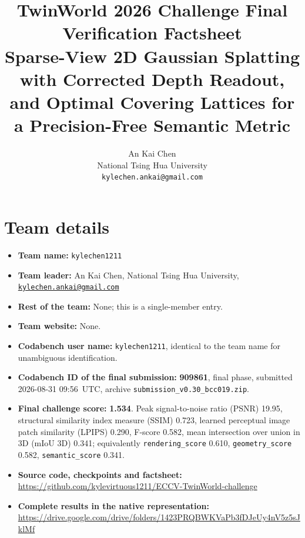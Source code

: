 \documentclass[10pt,twocolumn,letterpaper]{article}
\newcommand{\code}[1]{\texttt{\small #1}}
\begin{document}
\title{TwinWorld 2026 Challenge Final Verification Factsheet\\
       Sparse-View 2D Gaussian Splatting with Corrected Depth Readout,\\
       and Optimal Covering Lattices for a Precision-Free Semantic Metric}

\author{An Kai Chen\\
National Tsing Hua University\\
{\tt\small kylechen.ankai@gmail.com}
}
\maketitle

\section{Team details}

\begin{itemize}\itemsep2pt
\item \textbf{Team name:} \code{kylechen1211}
\item \textbf{Team leader:} An Kai Chen, National Tsing Hua University,
      \href{mailto:kylechen.ankai@gmail.com}{\tt kylechen.ankai@gmail.com}
\item \textbf{Rest of the team:} None; this is a single-member entry.
\item \textbf{Team website:} None.
\item \textbf{Codabench user name:} \code{kylechen1211}, identical to the team
      name for unambiguous identification.
\item \textbf{Codabench ID of the final submission:} \textbf{909861}, final
      phase, submitted 2026-08-31 09:56~UTC, archive
      \code{submission\_v0.30\_bcc019.zip}.
\item \textbf{Final challenge score:} \textbf{1.534}. Peak signal-to-noise
      ratio (PSNR) 19.95, structural similarity index measure (SSIM) 0.723,
      learned perceptual image patch similarity (LPIPS) 0.290, F-score 0.582,
      mean intersection over union in 3D (mIoU 3D) 0.341; equivalently
      \code{rendering\_score} 0.610, \code{geometry\_score} 0.582,
      \code{semantic\_score} 0.341.
\item \textbf{Source code, checkpoints and factsheet:}
      \url{https://github.com/kylevirtuous1211/ECCV-TwinWorld-challenge}
\item \textbf{Complete results in the native representation:}
      \url{https://drive.google.com/drive/folders/1423PRQBWKVaPb3fDJeUy4nV5z5sJklMf}
\end{itemize}
\end{document}
